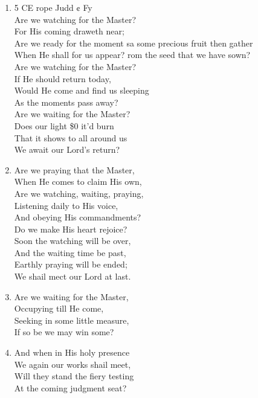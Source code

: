 \documentclass[11pt,a4paper]{article}
\begin{document}
\begin{enumerate}
    \item 5 CE rope Judd ¢ Fy \\
        Are we watching for the Master? \\
        For His coming draweth near; \\
        Are we ready for the moment sa some precious fruit then gather \\
        When He shall for us appear? rom the seed that we have sown? \\
        Are we watching for the Master? \\
        If He should return today, \\
        Would He come and find us sleeping \\
        As the moments pass away? \\
        Are we waiting for the Master? \\
        Does our light \$0 it'd burn \\
        That it shows to all around us \\
        We await our Lord's return?

    \item Are we praying that the Master, \\
        When He comes to claim His own, \\
        Are we watching, waiting, praying, \\
        Listening daily to His voice, \\
        And obeying His commandments? \\
        Do we make His heart rejoice? \\
        Soon the watching will be over, \\
        And the waiting time be past, \\
        Earthly praying will be ended; \\
        We shail mect our Lord at last.

    \item Are we waiting for the Master, \\
        Occupying till He come, \\
        Seeking in some little measure, \\
        If so be we may win some?

    \item And when in His holy presence \\
        We again our works shail meet, \\
        Will they stand the fiery testing \\
        At the coming judgment seat?

\end{enumerate}
\end{document}
